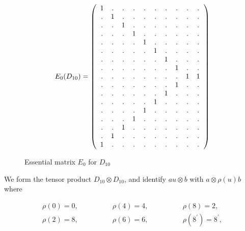 \documentclass[a4paper,11pt]{article}
\begin{document}
\begin{figure}
\begin{center}
$$
E_0 (D_{10})=
\left(
\begin{array}{cccccccccc}

1 & . & . & . & . & . & . & . & . & . \cr

. & 1 & . & . & . & . & . & . & . & . \cr

. & . & 1 & . & . & . & . & . & . & . \cr

. & . & . & 1 & . & . & . & . & . & . \cr

. & . & . & . & 1 & . & . & . & . & . \cr

. & . & . & . & . & 1 & . & . & . & . \cr

. & . & . & . & . & . & 1 & . & . & . \cr

. & . & . & . & . & . & . & 1 & . & . \cr

. & . & . & . & . & . & . & . & 1 & 1 \cr

. & . & . & . & . & . & . & 1 & . & . \cr

. & . & . & . & . & . & 1 & . & . & . \cr

. & . & . & . & . & 1 & . & . & . & . \cr

. & . & . & . & 1 & . & . & . & . & . \cr

. & . & . & 1 & . & . & . & . & . & . \cr

. & . & 1 & . & . & . & . & . & . & . \cr

. & 1 & . & . & . & . & . & . & . & . \cr

1 & . & . & . & . & . & . & . & . & . \cr

\end{array}
\right)
$$
\end{center}
\caption{Essential matrix $E_0$ for $D_{10}$}
\end{figure}

We form the tensor product $D_{10} \otimes D_{10}$, and
identify $a u \otimes b$ with $a \otimes \rho(u) b$ where

$$
\begin{array}{ccc}
\rho(0)=0, & \qquad \qquad \rho(4)=4, & \qquad \qquad \rho(8)=2,  \\
\rho(2)=8, & \qquad \qquad \rho(6)=6, & \qquad \qquad \rho(8^{'})=8^{'},
\end{array}
$$
\end{document}
